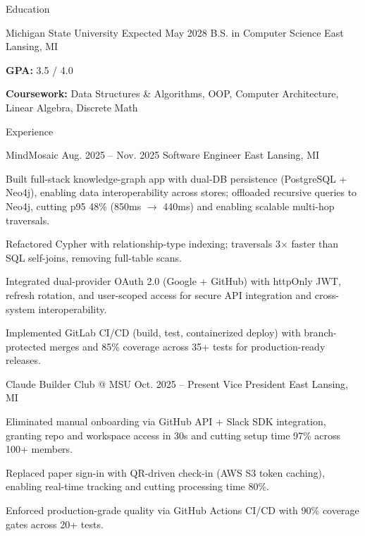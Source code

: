 \documentclass[
	11pt
]{../../../resume}
\begin{document}
	\begin{rSection}{E}{ducation}
		\begin{rSectionEntry}
			{Michigan State University}
			{Expected May 2028}
			{B.S. in Computer Science}
			{}
			{East Lansing, MI}

			\item \textbf{GPA:} 3.5 / 4.0
			\item \textbf{Coursework:} Data Structures \& Algorithms, OOP, Computer Architecture, Linear Algebra, Discrete Math
		\end{rSectionEntry}
	\end{rSection}

	\begin{rSection}{E}{xperience}
		\begin{rSectionEntry}
			{MindMosaic}
			{Aug. 2025 -- Nov. 2025}
			{Software Engineer}
			{}
			{East Lansing, MI}

			\item Built full-stack knowledge-graph app with dual-DB persistence (PostgreSQL + Neo4j), enabling data interoperability across stores; offloaded recursive queries to Neo4j, cutting p95 48\% (850ms $\rightarrow$ 440ms) and enabling scalable multi-hop traversals.
			\item Refactored Cypher with relationship-type indexing; traversals 3$\times$ faster than SQL self-joins, removing full-table scans.
			\item Integrated dual-provider OAuth 2.0 (Google + GitHub) with httpOnly JWT, refresh rotation, and user-scoped access for secure API integration and cross-system interoperability.
			\item Implemented GitLab CI/CD (build, test, containerized deploy) with branch-protected merges and 85\% coverage across 35+ tests for production-ready releases.
		\end{rSectionEntry}

		\begin{rSectionEntry}
			{Claude Builder Club @ MSU}
			{Oct. 2025 -- Present}
			{Vice President}
			{}
			{East Lansing, MI}

			\item Eliminated manual onboarding via GitHub API + Slack SDK integration, granting repo and workspace access in 30s and cutting setup time 97\% across 100+ members.
			\item Replaced paper sign-in with QR-driven check-in (AWS S3 token caching), enabling real-time tracking and cutting processing time 80\%.
			\item Enforced production-grade quality via GitHub Actions CI/CD with 90\% coverage gates across 20+ tests.
		\end{rSectionEntry}
	\end{rSection}
\end{document}
